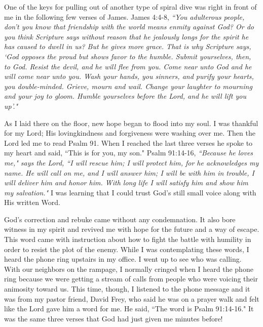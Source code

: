 \documentclass[oneside]{book}
\begin{document}
One of the keys for pulling out of another type of spiral dive was right in front of me in the following few verses of James. James 4:4-8, \textit{``You adulterous people, don't you know that friendship with the world means enmity against God? Or do you think Scripture says without reason that he jealously longs for the spirit he has caused to dwell in us? But he gives more grace. That is why Scripture says, `God opposes the proud but shows favor to the humble. Submit yourselves, then, to God. Resist the devil, and he will flee from you. Come near unto God and he will come near unto you. Wash your hands, you sinners, and purify your hearts, you double-minded. Grieve, mourn and wail. Change your laughter to mourning and your joy to gloom. Humble yourselves before the Lord, and he will lift you up'."}

As I laid there on the floor, new hope began to flood into my soul. I was thankful for my Lord; His lovingkindness and forgiveness were washing over me. Then the Lord led me to read Psalm 91. When I reached the last three verses he spoke to my heart and said, ``This is for you, my son." Psalm 91:14-16, \textit{``Because he loves me," says the Lord, ``I will rescue him; I will protect him, for he acknowledges my name. He will call on me, and I will answer him; I will be with him in trouble, I will deliver him and honor him. With long life I will satisfy him and show him my salvation."} I was learning that I could trust God's still small voice along with His written Word.


God's correction and rebuke came without any condemnation. It also bore witness in my spirit and revived me with hope for the future and a way of escape. This word came with instruction about how to fight the battle with humility in order to resist the plot of the enemy. While I was contemplating these words, I heard the phone ring upstairs in my office. I went up to see who was calling. With our neighbors on the rampage, I normally cringed when I heard the phone ring because we were getting a stream of calls from people who were voicing their animosity toward us. This time, though, I listened to the phone message and it was from my pastor friend, David Frey, who said he was on a prayer walk and felt like the Lord gave him a word for me. He said, ``The word is Psalm 91:14-16." It was the same three verses that God had just given me minutes before!
\end{document}
